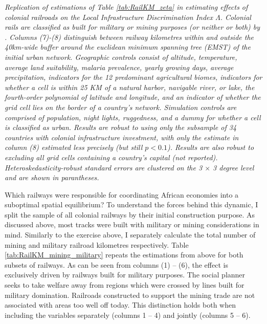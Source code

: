 \documentclass[11pt, oneside]{article}   	%
\newcommand{\mysubcaption}[1]{
\justify
\begin{spacing}{0.7}
\textit{\footnotesize #1}
\end{spacing}}
\begin{document}
\begin{table}[t]
{}

\mysubcaption{Replication of estimations of Table \eqref{tab:RailKM_zeta} in estimating effects of colonial railroads on the Local Infrastructure Discrimination Index $\Lambda$. Colonial rails are classified as built for military or mining purposes (or neither or both) by \cite{jedwab_permanent_2016}. Columns (7)-(8) distinguish between railway kilometres within and outside the 40km-wide buffer around the euclidean minimum spanning tree (EMST) of the initial urban network. Geographic controls consist of altitude, temperature, average land suitability, malaria prevalence, yearly growing days, average precipitation, indicators for the 12 predominant agricultural biomes, indicators for whether a cell is within 25 KM of a natural harbor, navigable river, or lake, the fourth-order polynomial of latitude and longitude, and an indicator of whether the grid cell lies on the border of a country's network. Simulation controls are comprised of population, night lights, ruggedness, and a dummy for whether a cell is classified as urban. Results are robust to using only the subsample of 34 countries with colonial infrastructure investment, with only the estimate in column (8) estimated less precisely (but still $p<0.1$). Results are also robust to excluding all grid cells containing a country's capital (not reported). Heteroskedasticity-robust standard errors are clustered on the 3 $\times$ 3 degree level and are shown in parantheses.}
\end{table}

Which railways were responsible for coordinating African economies into a suboptimal spatial equilibrium? To understand the forces behind this dynamic, I split the sample of all colonial railways by their initial construction purpose. As discussed above, most tracks were built with military or mining considerations in mind. Similarly to the exercise above, I separately calculate the total number of mining and military railroad kilometres respectively. Table \eqref{tab:RailKM_mining_military} repeats the estimations from above for both subsets of railways. As can be seen from columns (1) -- (6), the effect is exclusively driven by railways built for military purposes. The social planner seeks to take welfare away from regions which were crossed by lines built for military domination. Railroads constructed to support the mining trade are not associated with areas too well off today. This distinction holds both when including the variables separately (columns 1 -- 4) and jointly (columns 5 -- 6).
\end{document}
